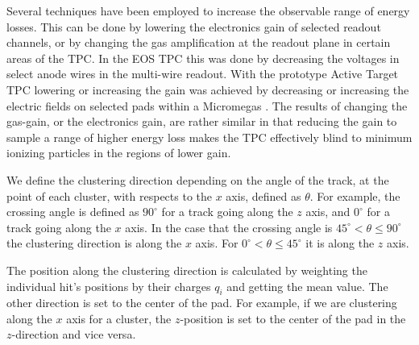 Several techniques have been employed to increase the observable range of energy losses. This can be done by lowering the electronics gain of selected readout channels, or by changing the gas amplification at the readout plane in certain areas of the TPC. In the EOS TPC \cite{eos} this was done by decreasing the voltages in select anode wires in the multi-wire readout. With the prototype Active Target TPC lowering or increasing the gain was achieved by decreasing or increasing the electric fields on selected pads within a Micromegas \cite{pattpc}. The results of changing the gas-gain, or the electronics gain, are rather similar in that reducing the gain to sample a range of higher energy loss makes the TPC effectively blind to minimum ionizing particles in  the regions of lower gain.




We define the clustering direction depending on the angle of the track, at the point of each cluster, with respects to the $x$ axis, defined as $\theta$. For example, the crossing angle is defined as $90^{\circ}$ for a track going along the $z$ axis, and $0^{\circ}$ for a track going along the $x$ axis. In the case that the crossing angle is $45^{\circ} < \theta \leq 90^{\circ} $ the clustering direction is along the $x$ axis. For $0^{\circ} < \theta \leq 45^{\circ}$ it is along the $z$ axis. 

 The position along the clustering direction is calculated by weighting the individual hit's positions by their charges $q_i$ and getting the mean value. The other direction is set to the center of the pad. For example, if we are clustering along the $x$ axis for a cluster, the $z$-position is set to the center of the pad in the $z$-direction and vice versa. 
 


